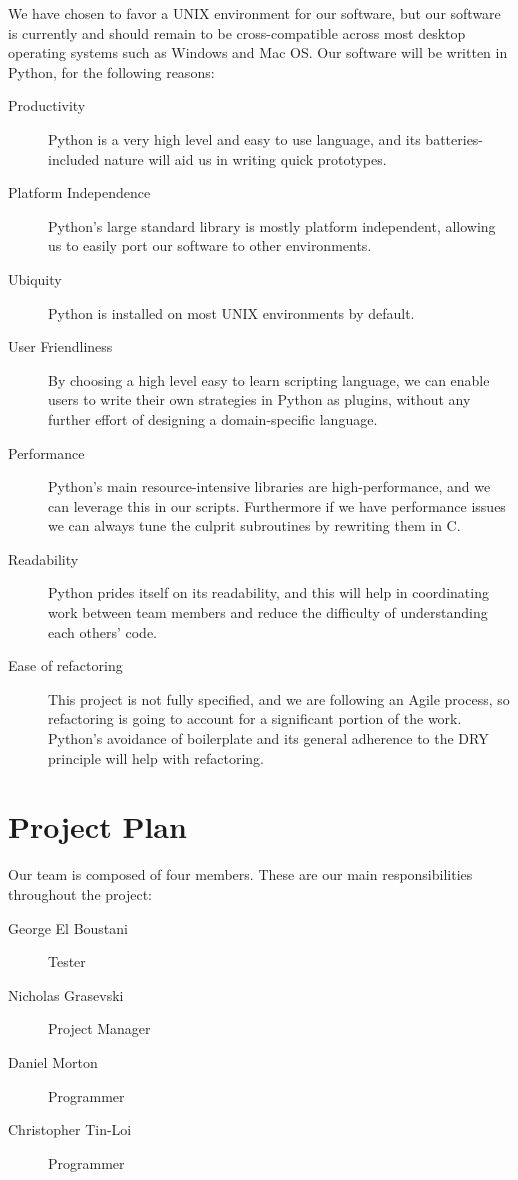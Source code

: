 \documentclass{article}
\begin{document}
We have chosen to favor a UNIX environment for our software, but our software is currently and should remain to be cross-compatible across most desktop operating systems such as Windows and Mac OS\@. Our software will be written in Python, for the following reasons:
\begin{description}
  \item[Productivity] Python is a very high level and easy to use language, and its batteries-included nature will aid us in writing quick prototypes.
  \item[Platform Independence] Python's large standard library is mostly platform independent, allowing us to easily port our software to other environments.
  \item[Ubiquity] Python is installed on most UNIX environments by default.
  \item[User Friendliness] By choosing a high level easy to learn scripting language, we can enable users to write their own strategies in Python as plugins, without any further effort of designing a domain-specific language.
  \item[Performance] Python's main resource-intensive libraries are high-performance, and we can leverage this in our scripts. Furthermore if we have performance issues we can always tune the culprit subroutines by rewriting them in C.
  \item[Readability] Python prides itself on its readability, and this will help in coordinating work between team members and reduce the difficulty of understanding each others' code.
  \item[Ease of refactoring] This project is not fully specified, and we are following an Agile process, so refactoring is going to account for a significant portion of the work. Python's avoidance of boilerplate and its general adherence to the DRY principle will help with refactoring.
\end{description}


\section{Project Plan}

Our team is composed of four members. These are our main responsibilities throughout the project:
\begin{description}
  \item[George El Boustani] Tester
  \item[Nicholas Grasevski] Project Manager
  \item[Daniel Morton] Programmer
  \item[Christopher Tin-Loi] Programmer
\end{description}
\end{document}
